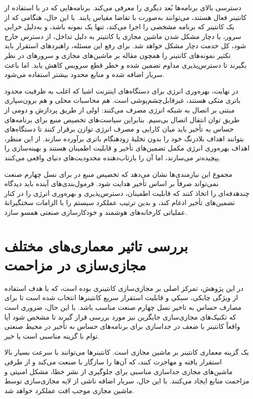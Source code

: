 دسترسی بالای برنامه‌ها بُعد دیگری را معرفی می‌کند. برنامه‌هایی که در  با استفاده از کانتینر فعال هستند، می‌توانند به‌صورت با تقاضا مقیاس یابند. با این حال، هنگامی که از یک کانتینر که برنامه مشخصی را اجرا می‌کند، تنها یک نمونه باشد، و به‌دلیل خرابی سرور، یا دچار مشکل شدن ماشین مجازی یا کانتینر به دلیل تداخل، از دسترس خارج شود، کل خدمت دچار مشکل خواهد شد. برای رفع این مسئله، راهبردهای استقرار باید تکثیر نمونه‌های کانتینر را همچون مقاله \cite{Zhang2020Neighbors} بر ماشین‌های مجازی و سرور‌های در نظر بگیرند تا دسترس‌پذیری مداوم تضمین شده و خطر قطع سرویس کاهش یابد. اما باعث سربار اضافه شده و منابع محدود  بیشتر استفاده می‌شود.

در نهایت، بهره‌وری انرژی برای دستگاه‌های اینترنت اشیا که اغلب به ظرفیت محدود باتری متکی هستند، غیرقابل‌چشم‌پوشی است. هم محاسبات محلی و هم برون‌سپاری مبتنی بر اتصال به شبکه انرژی مصرف می‌کنند\cite{Kaur2020KEIDS}: اولی از طریق پردازش و دومی از طریق توان انتقال اتصال بی‌سیم. بنابراین سیاست‌های تخصیص منبع برای برنامه‌های حساس به تأخیر باید میان کارایی و مصرف انرژی توازن برقرار کنند تا دستگاه‌های  بتوانند اهداف بلادرنگ خود را بدون تخلیهٔ زودهنگام باتری برآورده سازند. از این منظر، اهداف بهره‌وری انرژی مکمل تضمین‌های تأخیر و قابلیت اطمینان هستند و بهینه‌سازی را پیچیده‌تر می‌سازند، اما آن را بازتاب‌دهنده محدودیت‌های دنیای واقعی می‌کنند.

مجموع این نیازمندی‌ها نشان می‌دهد که تخصیص منبع در  برای نسل چهارم صنعت نمی‌تواند صرفاً بر اساس تأخیر هدایت شود. فرمول‌بندی‌های آینده باید دیدگاه چندهدفه‌ای را اتخاذ کنند که قابلیت اطمینان، دسترس‌پذیری و بهره‌وری انرژی را در کنار تضمین‌های تأخیر ادغام کند، و بدین ترتیب عملکرد سیستم را با الزامات سختگیرانهٔ عملیاتی کارخانه‌های هوشمند و خودکارسازی صنعتی همسو سازد.

\section{بررسی تاثیر معماری‌های مختلف مجازی‌سازی در مزاحمت}

در این پژوهش، تمرکز اصلی بر مجازی‌سازی کانتینری بوده است، که با هدف استفاده از ویژگی چابکی، سبکی و قابلیت استقرار سریع کانتینرها انتخاب شده است تا برای مصارف حساس به تاخیر نسل چهارم صنعت مناسب باشد. با این حال، ضروری است که تکنیک‌های مجازی‌سازی جایگزین نیز مورد بررسی قرار گیرند تا مشخص شود آیا واقعاً کانتینر با ضعف در جداسازی برای برنامه‌های حساس به تأخیر در محیط‌ صنعتی توام با  گزینه مناسبی است یا خیر.

یک گزینه‌ معماری کانتینر بر ماشین مجازی است. کانتینرها می‌توانند با سرعت بسیار بالا استقرار یافته و مهاجرت کنند، که آن‌ها را سازگار با صنعت می‌کند و از طرفی ماشین‌های مجازی جداسازی مناسبی برای جلوگیری از نشر خطا، مشکل امنیتی و مزاحمت منابع ایجاد می‌کنند. با این حال، سربار اضافه ناشی از لایه مجازی‌سازی توسط ماشین مجازی موجب افت عملکرد خواهد شد.

